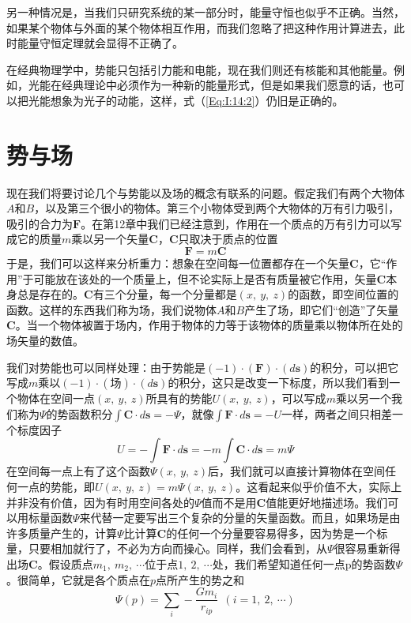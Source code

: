 另一种情况是，当我们只研究系统的某一部分时，能量守恒也似乎不正确。当然，如果某个物体与外面的某个物体相互作用，而我们忽略了把这种作用计算进去，此时能量守恒定理就会显得不正确了。

在经典物理学中，势能只包括引力能和电能，现在我们则还有核能和其他能量。例如，光能在经典理论中必须作为一种新的能量形式，但是如果我们愿意的话，也可以把光能想象为光子的动能，这样，式（\ref{Eq:I:14:2}）仍旧是正确的。

\section{势与场}

现在我们将要讨论几个与势能以及场的概念有联系的问题。假定我们有两个大物体$A$和$B$，以及第三个很小的物体。第三个小物体受到两个大物体的万有引力吸引，吸引的合力为$\boldsymbol{F}$。在第12章中我们已经注意到，作用在一个质点的万有引力可以写成它的质量$m$乘以另一个矢量$\boldsymbol{C}$，$\boldsymbol{C}$只取决于质点的位置
\begin{equation*}
    \boldsymbol{F}=m\boldsymbol{C}
\end{equation*}
于是，我们可以这样来分析重力：想象在空间每一位置都存在一个矢量$\boldsymbol{C}$，它“作用”于可能放在该处的一个质量上，但不论实际上是否有质量被它作用，矢量$\boldsymbol{C}$本身总是存在的。$\boldsymbol{C}$有三个分量，每一个分量都是$(x,~y,~z)$的函数，即空间位置的函数。这样的东西我们称为场，我们说物体$A$和$B$产生了场，即它们“创造”了矢量$\boldsymbol{C}$。当一个物体被置于场内，作用于物体的力等于该物体的质量乘以物体所在处的场矢量的数值。

我们对势能也可以同样处理：由于势能是$(-1) \cdot (\boldsymbol{F}) \cdot (d\boldsymbol{s})$的积分，可以把它写成$m$乘以$(-1) \cdot (\text{场}) \cdot (d\boldsymbol{s})$的积分，这只是改变一下标度，所以我们看到一个物体在空间一点$(x,~y,~z)$所具有的势能$U(x,~y,~z)$，可以写成$m$乘以另一个我们称为$\varPsi $的势函数积分$\int \boldsymbol{C} \cdot d\boldsymbol{s}=- \varPsi$，就像$\int \boldsymbol{F} \cdot d\boldsymbol{s}=-U$一样，两者之间只相差一个标度因子
\begin{equation}
    \label{Eq:I:14:7}
    U=-\int \boldsymbol{F} \cdot d\boldsymbol{s}=-m \int \boldsymbol{C} \cdot d\boldsymbol{s}=m \varPsi
\end{equation}
在空间每一点上有了这个函数$\varPsi(x,~y,~z)$后，我们就可以直接计算物体在空间任何一点的势能，即$U(x,~y,~z)=m\varPsi (x,~y,~z)$。这看起来似乎价值不大，实际上并非没有价值，因为有时用空间各处的$\varPsi$值而不是用$\boldsymbol{C}$值能更好地描述场。我们可以用标量函数$\varPsi$来代替一定要写出三个复杂的分量的矢量函数。而且，如果场是由许多质量产生的，计算$\varPsi$比计算$\boldsymbol{C}$的任何一个分量要容易得多，因为势是一个标量，只要相加就行了，不必为方向而操心。同样，我们会看到，从$\varPsi$很容易重新得出场$\boldsymbol{C}$。假设质点$m_1,~m_2,~ \cdots$位于点$1,~2,~\cdots$处，我们希望知道任何一点p的势函数$\varPsi$。很简单，它就是各个质点在$p$点所产生的势之和
\begin{equation}
    \label{Eq:I:14:8}
    \varPsi (p) = \sum_i - \frac{Gm_i}{r_{ip}} ~~(i=1,~2,~\cdots)
\end{equation}

